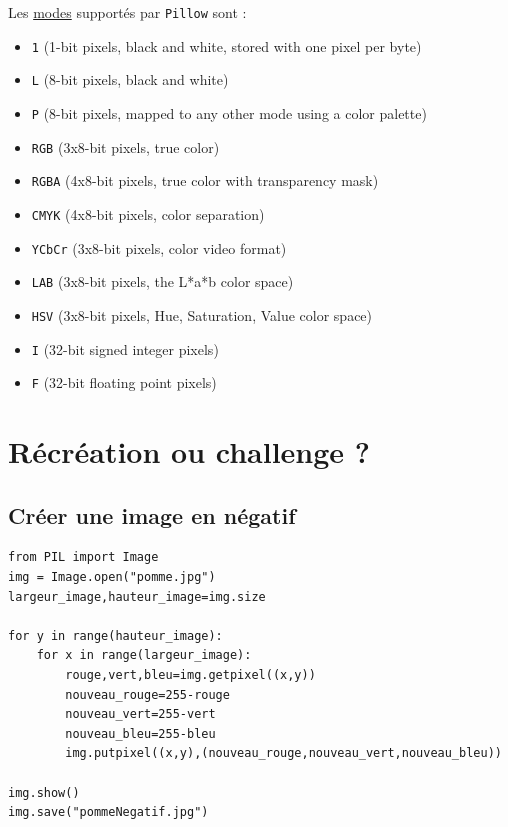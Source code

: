 \documentclass[11pt]{article}
\begin{document}
Les \href{https://pillow.readthedocs.io/en/latest/handbook/concepts.html\#modes}{modes} supportés par \texttt{Pillow} sont : 

\begin{itemize}
\item \texttt{1} (1-bit pixels, black and white, stored with one pixel per byte)
\item \texttt{L} (8-bit pixels, black and white)
\item \texttt{P} (8-bit pixels, mapped to any other mode using a color palette)
\item \texttt{RGB} (3x8-bit pixels, true color)
\item \texttt{RGBA} (4x8-bit pixels, true color with transparency mask)
\item \texttt{CMYK} (4x8-bit pixels, color separation)
\item \texttt{YCbCr} (3x8-bit pixels, color video format)
\item \texttt{LAB} (3x8-bit pixels, the L*a*b color space)
\item \texttt{HSV} (3x8-bit pixels, Hue, Saturation, Value color space)
\item \texttt{I} (32-bit signed integer pixels)
\item \texttt{F} (32-bit floating point pixels)
\end{itemize}



\section{Récréation ou challenge ?}
\label{sec:orgc6275f8}

\subsection{Créer une image en négatif}
\label{sec:orgc024222}

\begin{verbatim}
from PIL import Image
img = Image.open("pomme.jpg")
largeur_image,hauteur_image=img.size

for y in range(hauteur_image):
    for x in range(largeur_image):
        rouge,vert,bleu=img.getpixel((x,y))
        nouveau_rouge=255-rouge
        nouveau_vert=255-vert
        nouveau_bleu=255-bleu
        img.putpixel((x,y),(nouveau_rouge,nouveau_vert,nouveau_bleu))

img.show()
img.save("pommeNegatif.jpg")
\end{verbatim}
\end{document}
